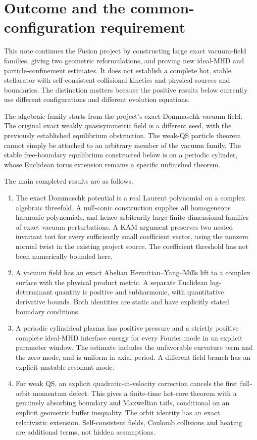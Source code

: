 \documentclass[11pt]{article}
\begin{document}
\section{Outcome and the common-configuration requirement}

This note continues the Fusion project by constructing large exact vacuum-field families, giving two geometric reformulations, and proving new ideal-MHD and particle-confinement estimates. It does not establish a complete hot, stable stellarator with self-consistent collisional kinetics and physical sources and boundaries. The distinction matters because the positive results below currently use different configurations and different evolution equations.

The algebraic family starts from the project's exact Dommaschk vacuum field. The original exact weakly quasisymmetric field is a different seed, with the previously established equilibrium obstruction. The weak-QS particle theorem cannot simply be attached to an arbitrary member of the vacuum family. The stable free-boundary equilibrium constructed below is on a periodic cylinder, whose Euclidean torus extension remains a specific unfinished theorem.

The main completed results are as follows.
\begin{enumerate}
\item The exact Dommaschk potential is a real Laurent polynomial on a complex algebraic threefold. A null-conic construction supplies all homogeneous harmonic polynomials, and hence arbitrarily large finite-dimensional families of exact vacuum perturbations. A KAM argument preserves two nested invariant tori for every sufficiently small coefficient vector, using the nonzero normal twist in the existing project source. The coefficient threshold has not been numerically bounded here.
\item A vacuum field has an exact Abelian Hermitian--Yang--Mills lift to a complex surface with the physical product metric. A separate Euclidean log-determinant quantity is positive and subharmonic, with quantitative derivative bounds. Both identities are static and have explicitly stated boundary conditions.
\item A periodic cylindrical plasma has positive pressure and a strictly positive complete ideal-MHD interface energy for every Fourier mode in an explicit parameter window. The estimate includes the unfavorable curvature term and the zero mode, and is uniform in axial period. A different field branch has an explicit unstable resonant mode.
\item For weak QS, an explicit quadratic-in-velocity correction cancels the first full-orbit momentum defect. This gives a finite-time hot-core theorem with a genuinely absorbing boundary and Maxwellian tails, conditional on an explicit geometric buffer inequality. The orbit identity has an exact relativistic extension. Self-consistent fields, Coulomb collisions and heating are additional terms, not hidden assumptions.
\end{enumerate}
\end{document}
